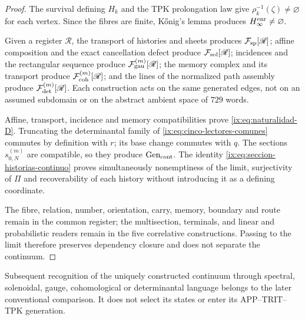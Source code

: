\begin{proof}
The survival defining \(H_k\) and the TPK prolongation law give
\(\rho_k^{-1}(\zeta)\neq\varnothing\) for each vertex. Since the fibres are
finite, Kőnig’s lemma produces \(H_\infty^{\rm enr}\neq\varnothing\).

Given a register \(\mathscr R\), the transport of histories and sheets produces
\(\mathcal F_{\rm sp}[\mathscr R]\); affine composition and the exact cancellation
defect produce \(\mathcal F_{\rm sol}[\mathscr R]\); incidences
and the rectangular sequence produce \(\mathcal F_{\rm gau}^{(m)}[\mathscr R]\);
the memory complex and its transport produce
\(\mathcal F_{\rm coh}^{(m)}[\mathscr R]\); and the lines of the normalized
path assembly produce \(\mathcal F_{\rm det}^{(m)}[\mathscr R]\).
Each construction acts on the same generated edges, not on an
assumed subdomain or on the abstract ambient space of \(729\) words.

Affine, transport, incidence and memory compatibilities prove
\eqref{ix:eq:naturalidad-D}. Truncating the determinantal family of
\eqref{ix:eq:cinco-lectores-comunes} commutes by
definition with \(r\); its base change commutes with \(q\). The sections
\(s_{0,N}^{(m)}\) are compatible, so they produce
\(\operatorname{Gen}_{\rm cont}\). The identity
\eqref{ix:eq:seccion-historias-continuo} proves simultaneously
nonemptiness of the limit, surjectivity of \(\Pi\) and recoverability of each
history without introducing it as a defining coordinate.

The fibre, relation, number, orientation, carry, memory,
boundary and route remain in the common register; the multisection,
terminals, and linear and probabilistic readers remain in the five
correlative constructions. Passing to the limit therefore preserves dependency
closure and does not separate the continuum.
\end{proof}

Subsequent recognition of the uniquely constructed continuum through spectral,
solenoidal, gauge, cohomological or determinantal language belongs to the
later conventional comparison. It does not select its states or enter
its APP--TRIT--TPK generation.
